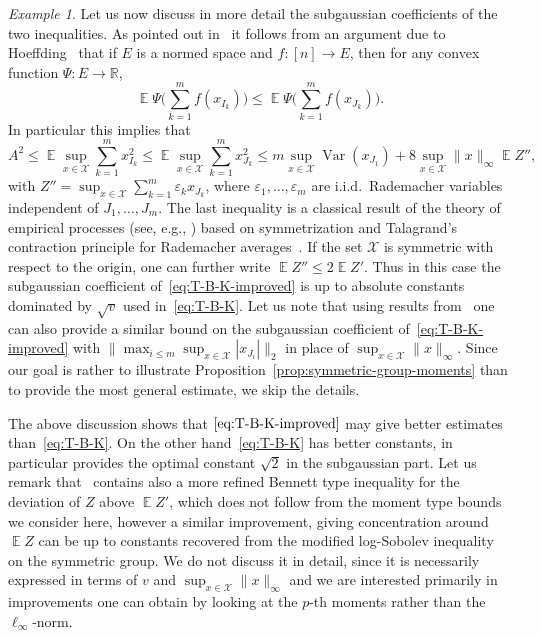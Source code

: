 \documentclass[a4paper]{amsart}
\theoremstyle{definition}
\theoremstyle{remark}
\newtheorem{example}[theorem]{Example}
\numberwithin{equation}{section}
\newcommand*{\RR}{\mathbb{R}}
\DeclareMathOperator{\EE}{\mathbb{E}} %
\DeclareMathOperator{\Var}{Var}	%
\begin{document}
\begin{example}
Let us now discuss in more detail the subgaussian coefficients of the two inequalities.
As pointed out in~\cite{gross2010note} it follows from an argument due to Hoeffding~\cite{MR144363} that if $E$ is a normed space and $f\colon [n] \to E$, then for any convex function $\Psi \colon E \to \RR$,
\begin{equation}\label{eq:stochasti-domination}
  \EE \Psi\Big(\sum_{k=1}^m f(x_{I_k})\Big) \le \EE \Psi\Big(\sum_{k=1}^m f(x_{J_k})\Big).
\end{equation}
In particular this implies that
\begin{displaymath}
  A^2 \le \EE \sup_{x \in \mathcal{X}} \sum_{k=1}^m x_{I_k}^2 \le \EE \sup_{x \in \mathcal{X}} \sum_{k=1}^m x_{J_k}^2 \le m\sup_{x\in \mathcal{X}}\Var(x_{J_1}) + 8\sup_{x\in \mathcal{X}}\|x\|_\infty \EE Z'',
\end{displaymath}
with $Z'' = \sup_{x \in \mathcal{X}} \sum_{k=1}^m \varepsilon_k x_{J_k}$, where $\varepsilon_1,\ldots,\varepsilon_m$ are i.i.d.\ Rademacher variables independent of $J_1,\ldots,J_m$.  The last inequality is a classical result of the theory of empirical processes (see, e.g., \cite{MR1258865,MR1782276,MR2123200}) based on symmetrization and Talagrand's contraction principle for Rademacher averages~\cite{MR1102015}. If the set $\mathcal{X}$ is symmetric with respect to the origin, one can further write $\EE Z'' \le 2\EE Z'$. Thus in this case the subgaussian coefficient of~\eqref{eq:T-B-K-improved} is up to absolute constants dominated by $\sqrt{v}$ used in~\eqref{eq:T-B-K}. Let us note that using results from~\cite{MR2123200} one can also provide a similar bound on the subgaussian coefficient of~\eqref{eq:T-B-K-improved} with $\|\max_{i\le m} \sup_{x\in \mathcal{X}} |x_{J_i}|\|_2$ in place of $\sup_{x\in\mathcal{X}} \|x\|_\infty$. Since our goal is rather to illustrate Proposition~\ref{prop:symmetric-group-moments} than to provide the most general estimate, we skip the details.



The above discussion shows that $\eqref{eq:T-B-K-improved}$ may give better estimates than~\eqref{eq:T-B-K}. On the other hand~\eqref{eq:T-B-K} has better constants, in particular provides the optimal constant $\sqrt{2}$ in the subgaussian part. Let us remark that~\cite{MR3480745} contains also a more refined Bennett type inequality for the deviation of $Z$ above $\EE Z'$, which does not follow from the moment type bounds we consider here, however a similar improvement, giving concentration around $\EE Z$ can be up to constants recovered from the modified log-Sobolev inequality on the symmetric group. We do not discuss it in detail, since it is necessarily expressed in terms of $v$ and $\sup_{x \in \mathcal{X}}\|x\|_\infty$ and we are interested primarily in improvements one can obtain by looking at the $p$-th moments rather than the $\ell_\infty$-norm.
\end{example}
\end{document}
